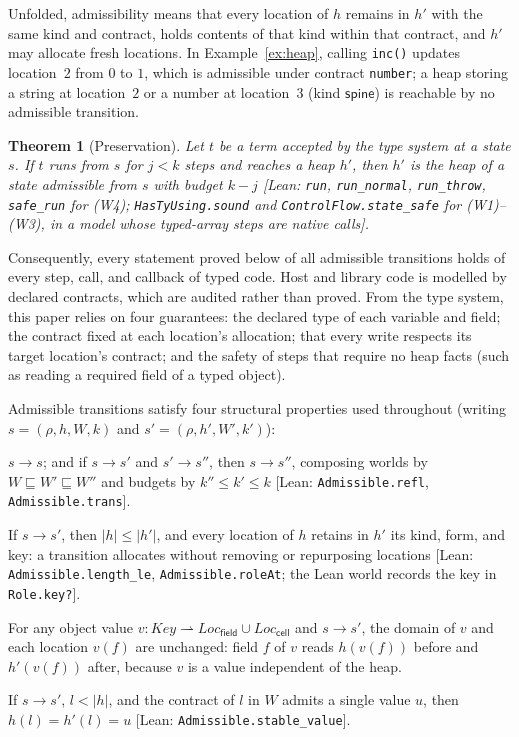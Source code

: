\documentclass[10pt,a4paper]{article}
\newtheorem{theorem}{Theorem}
\theoremstyle{definition}
\theoremstyle{remark}
\newcommand{\len}[1]{|#1|}
\newcommand{\tr}[1]{\xrightarrow{#1}}
\newcommand{\code}[1]{\texttt{#1}}
\newcommand{\kF}{\mathsf{field}}\newcommand{\kC}{\mathsf{cell}}\newcommand{\kE}{\mathsf{elem}}\newcommand{\kS}{\mathsf{spine}}\newcommand{\kI}{\mathsf{id}}
\newcommand{\LF}{\mathit{Loc}_{\kF}}\newcommand{\LC}{\mathit{Loc}_{\kC}}\newcommand{\LE}{\mathit{Loc}_{\kE}}\newcommand{\LS}{\mathit{Loc}_{\kS}}\newcommand{\LI}{\mathit{Loc}_{\kI}}
\newcommand{\lean}[1]{\texttt{\small #1}}
\newcommand{\status}[1]{\textsf{\small[#1]}}
\begin{document}
\noindent
Unfolded, admissibility means that every location of $h$ remains in $h'$
with the same kind and contract, holds contents of that kind within that
contract, and $h'$ may allocate fresh locations. In Example~\ref{ex:heap},
calling \code{inc()} updates location~$2$ from $0$ to $1$, which is
admissible under contract \code{number}; a heap storing a string at
location~$2$ or a number at location~$3$ (kind $\kS$) is reachable by no
admissible transition.

\begin{theorem}[Preservation]\label{thm:pres}
Let $t$ be a term accepted by the type system at a state $s$. If $t$
runs from $s$ for $j<k$ steps and reaches a heap $h'$, then $h'$ is the
heap of a state admissible from $s$ with budget $k-j$
\status{Lean: \lean{run}, \lean{run\_normal}, \lean{run\_throw},
\lean{safe\_run} for (W4); \lean{HasTyUsing.sound} and
\lean{ControlFlow.state\_safe} for (W1)--(W3), in a model whose typed-array steps are native calls}.
\end{theorem}

\noindent
Consequently, every statement proved below of all admissible transitions
holds of every step, call, and callback of typed code. Host and library
code is modelled by declared contracts, which are audited rather than
proved. From the type system, this paper relies on four guarantees: the
declared type of each variable and field; the contract fixed at each
location's allocation; that every write respects its target location's
contract; and the safety of steps that require no heap facts (such as
reading a required field of a typed object).

Admissible transitions satisfy four structural properties used throughout
(writing $s=(\rho,h,W,k)$ and $s'=(\rho,h',W',k')$):
\begin{description}[leftmargin=1.5em,style=nextline]
\item[(T1) Preorder] $s\tr{} s$; and if $s\tr{} s'$ and $s'\tr{} s''$, then
$s\tr{} s''$, composing worlds by $W\sqsubseteq W'\sqsubseteq W''$ and
budgets by $k''\le k'\le k$
\status{Lean: \lean{Admissible.refl}, \lean{Admissible.trans}}.
\item[(T2) Growth] If $s\tr{} s'$, then $\len h\le\len{h'}$, and
every location of $h$ retains in $h'$ its kind, form, and key: a
transition allocates without removing or repurposing locations
\status{Lean: \lean{Admissible.length\_le}, \lean{Admissible.roleAt}; the Lean world records the key in \lean{Role.key?}}.
\item[(T3) Fixed objects] For any object value
$v:\mathit{Key}\rightharpoonup\LF\cup\LC$ and $s\tr{} s'$, the
domain of $v$ and each location $v(f)$ are unchanged: field $f$ of $v$
reads $h(v(f))$ before and $h'(v(f))$ after, because $v$ is a value
independent of the heap.
\item[(T4) Immutable locations] If $s\tr{} s'$, $l<\len h$, and the
contract of $l$ in $W$ admits a single value $u$, then $h(l)=h'(l)=u$
\status{Lean: \lean{Admissible.stable\_value}}.
\end{description}
\end{document}
